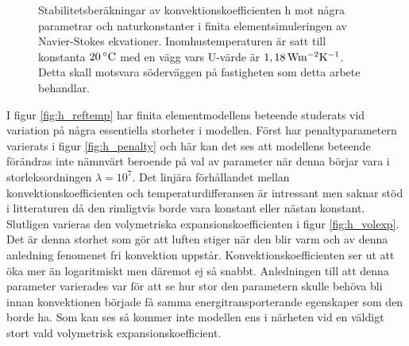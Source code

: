 \begin{figure}[hpbt]
\caption{\label{fig:konv_param}Stabilitetsberäkningar av konvektionskoefficienten h mot några
parametrar och naturkonstanter i finita elementsimuleringen av Navier-Stokes ekvationer.
Inomhustemperaturen är satt till konstanta $\unit[20]{^\circ C}$ med en vägg vars U-värde är
$\unit[1,18]{ Wm^{-2}K^{-1}}$. Detta skall motsvara söderväggen på fastigheten som detta arbete behandlar.}

\end{figure}

I figur \ref{fig:h_reftemp} har finita elementmodellens beteende studerats vid variation på några essentiella storheter i modellen.
Först har penaltyparametern varierats i figur \ref{fig:h_penalty} och här kan det ses att modellens beteende förändras inte nämnvärt
beroende på val av parameter när denna börjar vara i storleksordningen $\lambda = 10^7$. Det linjära förhållandet mellan
konvektionskoefficienten och temperaturdifferansen är intressant men saknar stöd i litteraturen då den rimligtvis borde vara
konstant eller nästan konstant. Slutligen varieras den volymetriska expansionskoefficienten
i figur \ref{fig:h_volexp}. Det är denna storhet
som gör att luften stiger när den blir varm och av denna anledning fenomenet fri konvektion uppstår. Konvektionskoefficienten
ser ut att öka mer än logaritmiskt men däremot ej så snabbt. Anledningen till att denna parameter varierades var för
att se hur stor den parametern skulle behöva bli innan konvektionen började få samma energitransporterande egenskaper
som den borde ha. Som kan ses så kommer inte modellen ens i närheten vid en väldigt stort vald volymetrisk expansionskoefficient.

